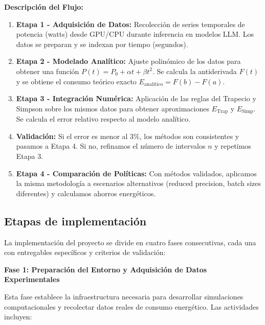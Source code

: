 \textbf{Descripción del Flujo:}

\begin{enumerate}
    \item \textbf{Etapa 1 - Adquisición de Datos:} Recolección de series temporales de potencia (watts) desde GPU/CPU durante inferencia en modelos LLM. Los datos se preparan y se indexan por tiempo (segundos).
    
    \item \textbf{Etapa 2 - Modelado Analítico:} Ajuste polinómico de los datos para obtener una función $P(t) = P_0 + \alpha t + \beta t^2$. Se calcula la antiderivada $F(t)$ y se obtiene el consumo teórico exacto $E_{\text{analítico}} = F(b) - F(a)$.
    
    \item \textbf{Etapa 3 - Integración Numérica:} Aplicación de las reglas del Trapecio y Simpson sobre los mismos datos para obtener aproximaciones $E_{\text{Trap}}$ y $E_{\text{Simp}}$. Se calcula el error relativo respecto al modelo analítico.
    
    \item \textbf{Validación:} Si el error es menor al 3\%, los métodos son consistentes y pasamos a Etapa 4. Si no, refinamos el número de intervalos $n$ y repetimos Etapa 3.
    
    \item \textbf{Etapa 4 - Comparación de Políticas:} Con métodos validados, aplicamos la misma metodología a escenarios alternativos (reduced precision, batch sizes diferentes) y calculamos ahorros energéticos.
\end{enumerate}

\subsection{Etapas de implementación}

La implementación del proyecto se divide en cuatro fases consecutivas, cada una con entregables específicos y criterios de validación:

\textbf{Fase 1: Preparación del Entorno y Adquisición de Datos Experimentales}

Esta fase establece la infraestructura necesaria para desarrollar simulaciones computacionales y recolectar datos reales de consumo energético. Las actividades incluyen:

